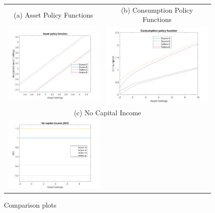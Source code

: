 \begin{figure}[H]
\caption{Comparison plots}
\hspace{-2.0cm}
\begin{center}
\begin{tabular}{cc}
\multicolumn{1}{c}{(a) Asset Policy Functions} &  
\multicolumn{1}{c}{(b) Consumption Policy Functions} \\
\includegraphics[angle=0,width=.5\textwidth]{figures/FIG11.png}   & 
\includegraphics[angle=0,width=.5\textwidth]{figures/FIG12.png}\\ 
\multicolumn{2}{c}{(c) No Capital Income} \\  
\includegraphics[angle=0,width=.5\textwidth]{figures/FIG13.png} 
\end{tabular}
\end{center}
\label{fig:5}
\end{figure}